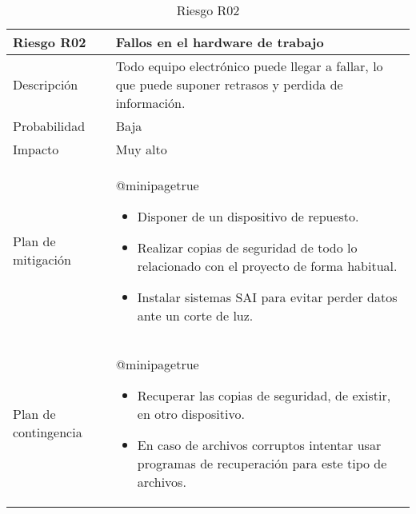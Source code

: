 \begin{table}[]
	\centering
	\begin{tabularx}{\textwidth}{|l|X|}
		\hline
		\rowcolor[HTML]{C0C0C0} 
		\textbf{Riesgo R02}  & \textbf{Fallos en el hardware de trabajo}                                                                                                                                                                                                             \\ \hline
		Descripción          & Todo equipo electrónico puede llegar a fallar, lo que puede suponer retrasos y perdida de información.                                                                                                                                                \\ \hline
		Probabilidad         & Baja                                                                                                                                                                                                                                                  \\ \hline
		Impacto              & Muy alto                                                                                                                                                                                                                                              \\ \hline
		Plan de mitigación   & \csname @minipagetrue\endcsname \begin{itemize}[leftmargin=*, noitemsep, topsep=0pt]
			\item Disponer de un dispositivo de repuesto.
			\item Realizar copias de seguridad de todo lo relacionado con el proyecto de forma habitual.
			\item Instalar sistemas SAI para evitar perder datos ante un corte de luz.
		\end{itemize} \\ \hline
		Plan de contingencia & \csname @minipagetrue\endcsname \begin{itemize}[leftmargin=*, noitemsep, topsep=0pt]
			\item Recuperar las copias de seguridad, de existir, en otro dispositivo.
			\item En caso de archivos corruptos intentar usar programas de recuperación para este tipo de archivos.
		\end{itemize} \\ \hline
	\end{tabularx}
	\caption{Riesgo R02}
	\label{riesgo_2}
\end{table}

